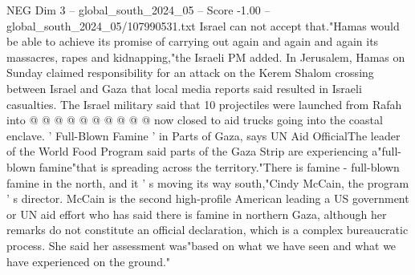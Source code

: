 \begin{textsample}{NEG Dim 3 – global\_south\_2024\_05 – Score -1.00 – global\_south\_2024\_05/107990531.txt}
Israel can not accept that."Hamas would be able to achieve its promise of carrying out again and again and again its massacres, rapes and kidnapping,"the Israeli PM added.
In Jerusalem, Hamas on Sunday claimed responsibility for an attack on the Kerem Shalom crossing between Israel and Gaza that local media reports said resulted in Israeli casualties.
The Israel military said that 10 projectiles were launched from Rafah into @ @ @ @ @ @ @ @ @ @ now closed to aid trucks going into the coastal enclave. ' Full-Blown Famine ' in Parts of Gaza, says UN Aid OfficialThe leader of the World Food Program said parts of the Gaza Strip are experiencing a"full-blown famine"that is spreading across the territory."There is famine - full-blown famine in the north, and it ' s moving its way south,"Cindy McCain, the program ' s director.
McCain is the second high-profile American leading a US government or UN aid effort who has said there is famine in northern Gaza, although her remarks do not constitute an official declaration, which is a complex bureaucratic process.
She said her assessment was"based on what we have seen and what we have experienced on the ground."

\end{textsample}
